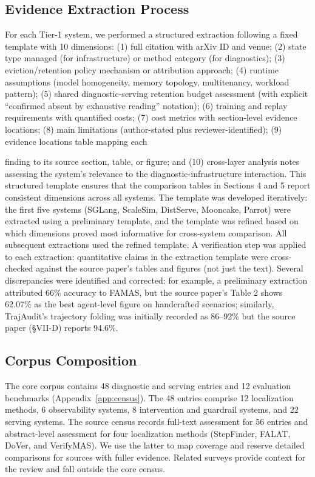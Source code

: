 \documentclass[preprint,12pt]{elsarticle}
\begin{document}
\subsection{Evidence Extraction Process}
For each Tier-1 system, we performed a structured extraction following a fixed template with 10 dimensions: (1) full citation with arXiv ID and venue; (2) state type managed (for infrastructure) or method category (for diagnostics); (3) eviction/retention policy mechanism or attribution approach; (4) runtime assumptions (model homogeneity, memory topology, multitenancy, workload pattern); (5) shared diagnostic-serving retention budget assessment (with explicit ``confirmed absent by exhaustive reading'' notation); (6) training and replay requirements with quantified costs; (7) cost metrics with section-level evidence locations; (8) main limitations (author-stated plus reviewer-identified); (9) evidence locations table mapping each


finding to its source section, table, or figure; and (10) cross-layer analysis notes assessing the system's relevance to the diagnostic-infrastructure interaction. This structured template ensures that the comparison tables in Sections 4 and 5 report consistent dimensions across all systems. The template was developed iteratively: the first five systems (SGLang, ScaleSim, DistServe, Mooncake, Parrot) were extracted using a preliminary template, and the template was refined based on which dimensions proved most informative for cross-system comparison. All subsequent extractions used the refined template. A verification step was applied to each extraction: quantitative claims in the extraction template were cross-checked against the source paper's tables and figures (not just the text). Several discrepancies were identified and corrected: for example, a preliminary extraction attributed 66\% accuracy to FAMAS, but the source paper's Table 2 shows 62.07\% as the best agent-level figure on handcrafted scenarios; similarly, TrajAudit's trajectory folding was initially recorded as 86--92\% but the source paper (\S{}VII-D) reports 94.6\%.


\subsection{Corpus Composition}
The core corpus contains 48 diagnostic and serving entries and 12 evaluation benchmarks (Appendix~\ref{app:census}). The 48 entries comprise 12 localization methods, 6 observability systems, 8 intervention and guardrail systems, and 22 serving systems. The source census records full-text assessment for 56 entries and abstract-level assessment for four localization methods (StepFinder, FALAT, DoVer, and VerifyMAS). We use the latter to map coverage and reserve detailed comparisons for sources with fuller evidence. Related surveys provide context for the review and fall outside the core census.
\end{document}
